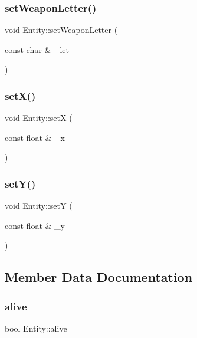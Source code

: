\subsubsection{\texorpdfstring{set\+Weapon\+Letter()}{setWeaponLetter()}}
{\footnotesize\ttfamily void Entity\+::set\+Weapon\+Letter (\begin{DoxyParamCaption}\item[{const char \&}]{\+\_\+let }\end{DoxyParamCaption})\hspace{0.3cm}{\ttfamily [inline]}}

\mbox{\label{class_entity_aebb55e45e12ba6eef0e25c261d5792db}} 
\subsubsection{\texorpdfstring{set\+X()}{setX()}}
{\footnotesize\ttfamily void Entity\+::setX (\begin{DoxyParamCaption}\item[{const float \&}]{\+\_\+x }\end{DoxyParamCaption})\hspace{0.3cm}{\ttfamily [inline]}}

\mbox{\label{class_entity_a6429685b0332977a73330ced6e2f06da}} 
\subsubsection{\texorpdfstring{set\+Y()}{setY()}}
{\footnotesize\ttfamily void Entity\+::setY (\begin{DoxyParamCaption}\item[{const float \&}]{\+\_\+y }\end{DoxyParamCaption})\hspace{0.3cm}{\ttfamily [inline]}}



\subsection{Member Data Documentation}
\mbox{\label{class_entity_a0d09a7e175d9dcfbfb359e5f74f2e692}} 
\subsubsection{\texorpdfstring{alive}{alive}}
{\footnotesize\ttfamily bool Entity\+::alive\hspace{0.3cm}{\ttfamily [private]}}

